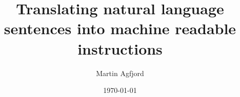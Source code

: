 \documentclass{beamer}
\begin{document}
\title{Translating natural language sentences into machine readable instructions} 
\author{Martin Agfjord} 
\date{\today} 










\end{document}
